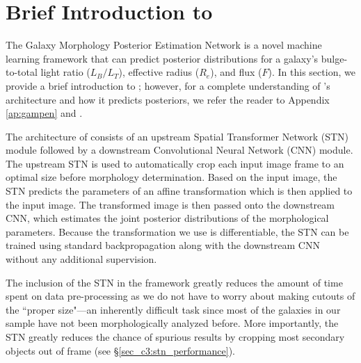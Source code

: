 \section{Brief Introduction to \gampen{}} \label{sec_c3:gampen}
The Galaxy Morphology Posterior Estimation Network \citep[\gampen{};][]{gampen_software_paper} is a novel machine learning framework that can predict posterior distributions for a galaxy's bulge-to-total light ratio ($L_B/L_T$), effective radius ($R_e$), and flux ($F$). In this section, we provide a brief introduction to \gampen{}; however, for a complete understanding of \gampen{}'s architecture and how it predicts posteriors, we refer the reader to Appendix \ref{ap:gampen} and \citet{gampen_software_paper}.

The architecture of \gampen{} consists of an upstream Spatial Transformer Network (STN) module followed by a downstream Convolutional Neural Network (CNN) module. The upstream STN is used to automatically crop each input image frame to an optimal size before morphology determination. Based on the input image, the STN predicts the parameters of an affine transformation which is then applied to the input image. The transformed image is then passed onto the downstream CNN, which estimates the joint posterior distributions of the morphological parameters. Because the transformation we use is differentiable, the STN can be trained using standard backpropagation along with the downstream CNN without any additional supervision.

The inclusion of the STN in the framework greatly reduces the amount of time spent on data pre-processing as we do not have to worry about making cutouts of the ``proper size"---an inherently difficult task since most of the galaxies in our sample have not been morphologically analyzed before. More importantly, the STN greatly reduces the chance of spurious results by cropping most secondary objects out of frame (see \S \ref{sec_c3:stn_performance}).

